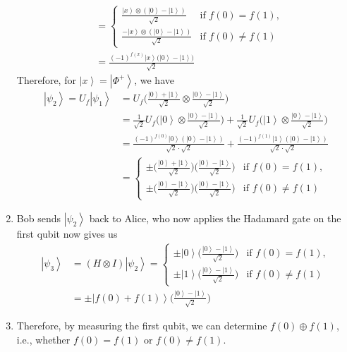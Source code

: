 \documentclass{article}
\newcommand{\ket}[1]{\ensuremath{\left|#1\right\rangle}}
\begin{document}
\begin{theorem}
\begin{enumerate}
\begin{align}
            & = \begin{cases} 
              \frac{\ket{x} \otimes ( \ket{0} - \ket{1})}{\sqrt{2}} & \text{if } f(0) = f(1), \\
              \frac{-\ket{x} \otimes ( \ket{0} - \ket{1})}{\sqrt{2}} & \text{if } f(0) \neq f(1) 
            \end{cases} \\
            & = \frac{(-1)^{f(x)} \ket{x} \big( \ket{0} - \ket{1} \big)}{\sqrt{2}}
          \end{align}
          Therefore, for $\ket{x} = \ket{\Phi^+}$, we have 
          \begin{align} 
            \ket{\psi_2} = U_f \ket{\psi_1} & = U_f \bigg( \frac{\ket{0} + \ket{1}}{\sqrt{2}} \otimes \frac{\ket{0} - \ket{1}}{\sqrt{2}} \bigg) \\
                             & = \frac{1}{\sqrt{2}} U_f \bigg( \ket{0} \otimes \frac{\ket{0} - \ket{1}}{\sqrt{2}} \bigg) + \frac{1}{\sqrt{2}} U_f \bigg( \ket{1} \otimes \frac{\ket{0} - \ket{1}}{\sqrt{2}} \bigg) \\ 
                             & = \frac{(-1)^{f(0)} \ket{0} ( \ket{0} - \ket{1})}{\sqrt{2} \cdot \sqrt{2}} + \frac{(-1)^{f(1)} \ket{1} ( \ket{0} - \ket{1})}{\sqrt{2} \cdot \sqrt{2}} \\  
                             & = \begin{cases} 
                               \pm \bigg( \frac{\ket{0} + \ket{1}}{\sqrt{2}} \bigg) \bigg( \frac{\ket{0} - \ket{1}}{\sqrt{2}} \bigg) & \text{if } f(0) = f(1), \\
                               \pm \bigg( \frac{\ket{0} - \ket{1}}{\sqrt{2}} \bigg) \bigg( \frac{\ket{0} - \ket{1}}{\sqrt{2}} \bigg) & \text{if } f(0) \neq f(1)
                             \end{cases}
          \end{align}
        \item Bob sends $\ket{\psi_2}$ back to Alice, who now applies the Hadamard gate on the first qubit now gives us 
          \begin{align} 
            \ket{\psi_3} & = (H \otimes I) \ket{\psi_2} = \begin{cases} 
              \pm \ket{0} \bigg( \frac{\ket{0} - \ket{1}}{\sqrt{2}} \bigg) & \text{if } f(0) = f(1), \\ 
              \pm \ket{1} \bigg( \frac{\ket{0} - \ket{1}}{\sqrt{2}} \bigg) & \text{if } f(0) \neq f(1)
            \end{cases} \\
                         & = \pm \ket{f(0) + f(1)} \bigg( \frac{\ket{0} - \ket{1}}{\sqrt{2}} \bigg) 
          \end{align}
        \item Therefore, by measuring the first qubit, we can determine $f(0) \oplus f(1)$, i.e., whether $f(0) = f(1)$ or $f(0) \neq f(1)$. 
      \end{enumerate}
    \end{theorem}
\end{document}
